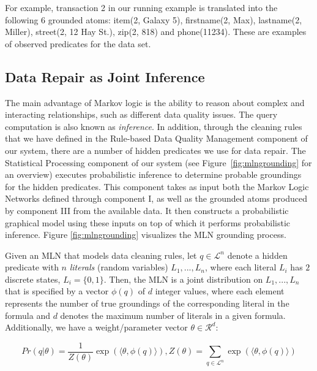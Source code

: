 For example, transaction 2 in our running example is translated into the following 6 grounded atoms: \textsf{item}(2, Galaxy 5), \textsf{firstname}(2, Max), \textsf{lastname}(2, Miller), \textsf{street}(2, 12 Hay St.), \textsf{zip}(2, 818) and \textsf{phone}(11234). These are examples of observed predicates for the data set. 

\subsection{Data Repair as Joint Inference}
The main advantage of Markov logic is the ability to reason about complex and interacting relationships, such as different data quality issues. The query computation is also known as \textit{inference}. In addition, through the cleaning rules that we have defined in the Rule-based Data Quality Management component of our system, there are a number of hidden predicates we use for data repair. The Statistical Processing component of our system (see Figure~\ref{fig:mlngrounding} for an overview) executes probabilistic 
inference to determine probable groundings for the hidden predicates. This component takes as input both the Markov Logic Networks defined through component I, as
well as the grounded atoms produced by component III from the available data. It then constructs a probabilistic graphical model using these inputs on top 
of which it performs probabilistic inference. Figure \ref{fig:mlngrounding} visualizes the MLN grounding process. 

Given an MLN that models data cleaning rules, let $q \in \mathcal{L}^n$ denote a hidden predicate with $n$ \emph{literals} (random variables) $L_1,...,L_n$, where each literal $L_i$
has $2$ discrete states, $L_i = \lbrace 0,1 \rbrace$.
Then, the MLN is a joint distribution on  $L_1,...,L_n$ that 
is specified by a vector $\phi(q)$ of $d$ integer values, where
each element represents the number of true groundings of the 
corresponding literal in the formula and $d$ denotes the 
maximum number of literals in a given formula. Additionally, 
we have a weight/parameter vector $\theta \in \mathcal{R}^d$:
\vspace{-3em}

\begin{equation*}
Pr \left( q | \theta \right) = 
\frac{1}{Z(\theta)} \exp\left( \langle \theta, \phi(q) \rangle  \right), 
Z(\theta) = \sum_{q \in \mathcal{L}^n}\exp\left( \langle \theta, \phi(q) \rangle  \right) 
\end{equation*}
\vspace{-2em}

